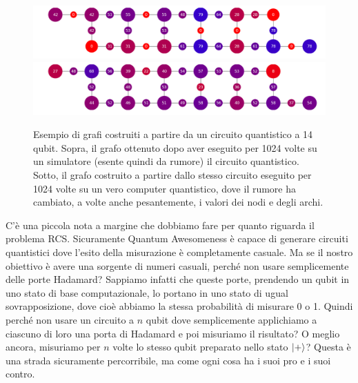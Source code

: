 \documentclass{book}
\theoremstyle{definition}
\theoremstyle{definition}
\theoremstyle{definition}
\theoremstyle{plain}
\theoremstyle{plain}
\theoremstyle{plain}
\theoremstyle{plain}
\begin{document}
 \begin{figure}[h!]
    \captionsetup{font=scriptsize}
    \begin{center}
        \includegraphics[width=1\textwidth]{Immagini troppo complicate/puzzle_quantum_example_1.png}
        \includegraphics[width=1\textwidth]{Immagini troppo complicate/puzzle_quantum_example_2.png}
    \end{center}
    \caption{\scriptsize Esempio di grafi costruiti a partire da un circuito quantistico a 14 qubit. Sopra, il grafo ottenuto dopo aver eseguito per 1024 volte su un simulatore (esente quindi da rumore) il circuito quantistico. Sotto, il grafo costruito a partire dallo stesso circuito eseguito per 1024 volte su un vero computer quantistico, dove il rumore ha cambiato, a volte anche pesantemente, i valori dei nodi e degli archi. \cite{wootton_puzzle}\cite{wootton_puzzle_2}}\label{fig:img_puzzle_quantum}
\end{figure}
\noindent C'è una piccola nota a margine che dobbiamo fare per quanto riguarda il problema RCS. Sicuramente Quantum Awesomeness è capace di generare circuiti quantistici dove l'esito della misurazione è completamente casuale. Ma se il nostro obiettivo è avere una sorgente di numeri casuali, perché non usare semplicemente delle porte Hadamard? Sappiamo infatti che queste porte, prendendo un qubit in uno stato di base computazionale, lo portano in uno stato di ugual sovrapposizione, dove cioè abbiamo la stessa probabilità di misurare 0 o 1. Quindi perché non usare un circuito a $n$ qubit dove semplicemente applichiamo a ciascuno di loro una porta di Hadamard e poi misuriamo il risultato? O meglio ancora, misuriamo per $n$ volte lo stesso qubit preparato nello stato $\ket{+}$? Questa è una strada sicuramente percorribile, ma come ogni cosa ha i suoi pro e i suoi contro.\\
\end{document}
